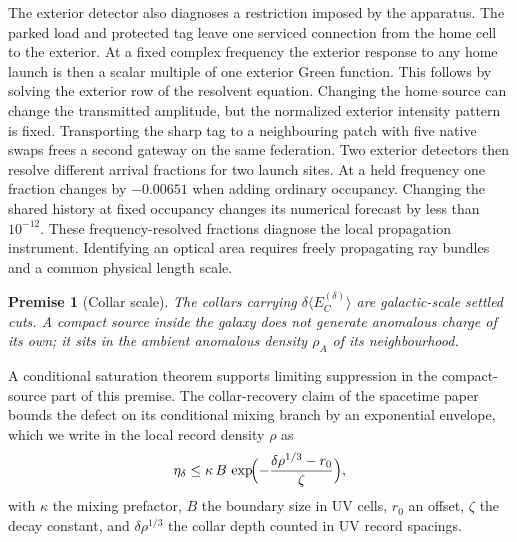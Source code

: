 \documentclass[11pt]{article}
\newtheorem{premise}[theorem]{Premise}
\begin{document}
The exterior detector also diagnoses a restriction imposed by the
apparatus. The parked load and protected tag leave one serviced
connection from the home cell to the exterior. At a fixed complex
frequency the exterior response to any home launch is then a scalar
multiple of one exterior Green function. This follows by solving the
exterior row of the resolvent equation. Changing the home source can
change the transmitted amplitude, but the normalized exterior
intensity pattern is fixed. Transporting the sharp tag to a neighbouring
patch with five native swaps frees a second gateway on the same
federation. Two exterior detectors then resolve different arrival
fractions for two launch sites. At a held frequency one fraction
changes by $-0.00651$ when adding ordinary occupancy. Changing the
shared history at fixed occupancy changes its numerical forecast by
less than $10^{-12}$. These frequency-resolved fractions diagnose the
local propagation instrument. Identifying an optical area requires
freely propagating ray bundles and a common physical length scale.

\begin{premise}[Collar scale]
\label{pre:scale}
The collars carrying \(\delta\langle E_C^{(\delta)}\rangle\) are
galactic-scale settled cuts. A compact source inside the galaxy does not
generate anomalous charge of its own; it sits in the ambient anomalous
density \(\rho_A\) of its neighbourhood.
\end{premise}

A conditional saturation theorem supports limiting suppression in the
compact-source part of this premise. The collar-recovery claim of the
spacetime paper~\cite{ophEinstein} bounds the
defect on its conditional mixing branch by an exponential envelope, which we
write in the local record density \(\rho\) as
\begin{equation}
\eta_\delta\le\kappa\,B\,
\exp\!\Bigl(-\frac{\delta\rho^{1/3}-r_0}{\zeta}\Bigr),
\label{eq:envelope}
\end{equation}
with \(\kappa\) the mixing prefactor, \(B\) the boundary size in UV cells,
\(r_0\) an offset, \(\zeta\) the decay constant, and \(\delta\rho^{1/3}\)
the collar depth counted in UV record spacings.
\end{document}
